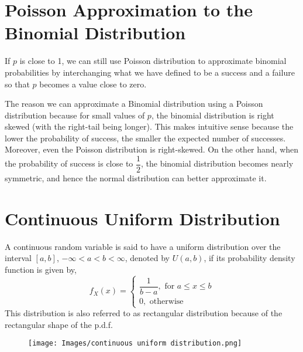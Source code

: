 \section{Poisson Approximation to the Binomial Distribution}
\begin{note}
\end{note}
If $p$ is close to 1, we can still use Poisson distribution to approximate binomial probabilities by interchanging what we have defined to be a success and a failure so that $p$ becomes a value close to zero.
\begin{note}
\end{note}
The reason we can approximate a Binomial distribution using a Poisson distribution because for small values of $p$, the binomial distribution is right skewed (with the right-tail being longer). This makes intuitive sense because the lower the probability of success, the smaller the expected number of successes. Moreover, even the Poisson distribution is right-skewed. On the other hand, when the probability of success is close to $\dfrac{1}{2}$, the binomial distribution becomes nearly symmetric, and hence the normal distribution can better approximate it.

\section{Continuous Uniform Distribution}
\begin{definition}
A continuous random variable is said to have a uniform distribution over the interval $[a,b]$, $-\infty < a < b < \infty$, denoted by $U(a,b)$, if its probability density function is given by,
$$
f_X(x) = \begin{cases}
\dfrac{1}{b-a}, \text{ for } a \leq x \leq b \\
0, \text{ otherwise}
\end{cases}
$$
This distribution is also referred to as rectangular distribution because of the rectangular shape of the p.d.f.
\end{definition}
\begin{figure}[ht]
    \centering
    \texttt{[image: Images/continuous uniform distribution.png]}
\end{figure}

